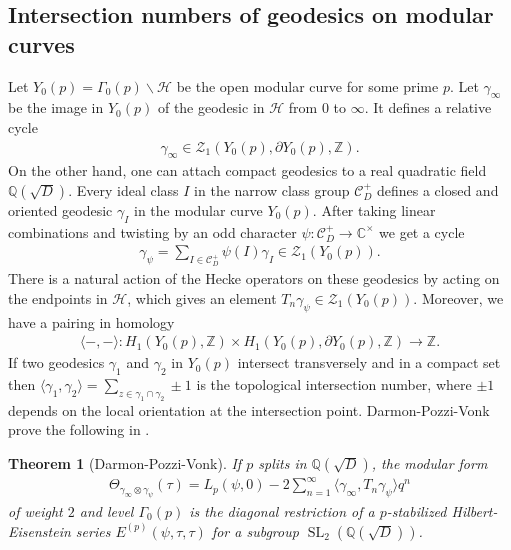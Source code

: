 \documentclass[11pt]{article} %
\newcommand{\8}{\infty}
\newcommand{\Z}{\mathbb{Z}}
\newcommand{\SL}{\operatorname{SL}}
\newcommand{\HH}{\mathscr{H}}
\newcommand{\Q}{\mathbb{Q}}
\newcommand{\C}{\mathbb{C}}
\newcommand{\Ccal}{\mathcal{C}}
\newcommand{\Zcal}{\mathcal{Z}}
\theoremstyle{mytheoremstyle}
\newtheorem*{thm*}{Theorem}
\theoremstyle{remark}
\numberwithin{equation}{section}
\begin{document}
\subsection{Intersection numbers of geodesics on modular curves} \label{motivation}
Let $Y_0(p)=\Gamma_0(p) \backslash \HH$ be the open modular curve for some prime $p$. Let $\gamma_\8$ be the image in $Y_0(p)$ of the geodesic in $\HH$ from $0$ to $\8$. It defines a relative cycle 
\begin{align}
    \gamma_\8 \in \Zcal_1(Y_0(p),\partial Y_0(p),\Z).
\end{align} 
On the other hand, one can attach compact geodesics to a real quadratic field $\Q(\sqrt{D})$. Every ideal class $I$ in the narrow class group $\Ccal^+_D$ defines a closed and oriented geodesic $\gamma_{I}$ in the modular curve $Y_0(p)$. After taking linear combinations and twisting by an odd character $\psi \colon \Ccal^+_D \longrightarrow \C^\times$ we get a cycle
\begin{align}
    \gamma_{\psi}=\sum_{I \in \Ccal^+_D} \psi(I) \gamma_I \in \Zcal_1(Y_0(p)).
\end{align}
There is a natural action of the Hecke operators on these geodesics by acting on the endpoints in $\HH$, which gives an element $T_n\gamma_{\psi}\in \Zcal_1(Y_0(p))$. Moreover, we have a pairing in homology
\begin{align}
    \langle - , - \rangle \colon H_1(Y_0(p),\Z) \times H_1(Y_0(p),\partial Y_0(p),\Z) \longrightarrow \Z.
\end{align}
If two geodesics $\gamma_1$ and $\gamma_2$ in $Y_0(p)$ intersect transversely and in a compact set then $\langle \gamma_1,\gamma_2 \rangle = \sum_{z \in \gamma_1 \cap \gamma_2} \pm 1$ is the topological intersection number, where $\pm 1$ depends on the local orientation at the intersection point.  Darmon-Pozzi-Vonk prove the following in \cite[Theorem.~A]{DPV}.
\begin{thm*}[Darmon-Pozzi-Vonk]
If $p$ splits in $\Q(\sqrt{D})$, the modular form \begin{align}\label{dpveq}
    \Theta_{\gamma_{\8} \otimes \gamma_{\psi}}(\tau)=L_p(\psi,0)-2 \sum_{n =1}^\8 \langle \gamma_{\8},T_n\gamma_{\psi} \rangle q^n
\end{align} of weight $2$ and level $\Gamma_0(p)$ is the diagonal restriction of a $p$-stabilized Hilbert-Eisenstein series $E^{(p)}(\psi,\tau,\tau)$ for a subgroup $\SL_2(\Q(\sqrt{D}))$.
\end{thm*}
\end{document}
